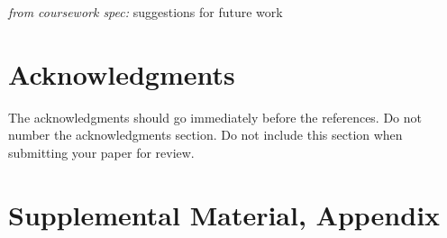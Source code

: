\documentclass[hidelinks, 11pt]{article}
\begin{document}
\textit{from coursework spec:} suggestions for future work


\section*{Acknowledgments}
\label{sec:acknowledgments}

The acknowledgments should go immediately before the references.  Do
not number the acknowledgments section. Do not include this section
when submitting your paper for review.

%
%



\appendix

\section{Supplemental Material, Appendix}
\label{sec:supplemental}
\end{document}
